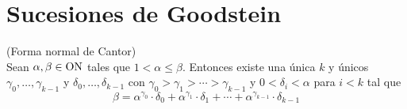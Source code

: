 \section{Sucesiones de Goodstein}
\begin{thm}\label{t35}
    (Forma normal de Cantor)\\
    Sean $\alpha,\beta\in\text{ON}$ tales que $1<\alpha\leq\beta$. Entonces existe una única $k$ y únicos $\gamma_0,\ldots,\gamma_{k-1}$ y $\delta_0,\ldots,\delta_{k-1}$ con $\gamma_0>\gamma_1>\cdots>\gamma_{k-1}$ y $0<\delta_i<\alpha$ para $i<k$ tal que
    \begin{equation}\tag{5}\label{5}
        \beta=\alpha^{\gamma_0}\cdot\delta_0+\alpha^{\gamma_1}\cdot\delta_1+\cdots+\alpha^{\gamma_{k-1}}\cdot\delta_{k-1}
    \end{equation}
\end{thm}
